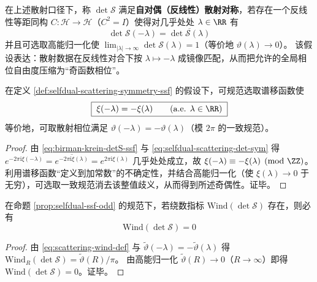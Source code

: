 \begin{definition}\label{def:selfdual-scattering-symmetry-ssf}
在上述散射口径下，称 \(\det\mathcal S\) 满足\textbf{自对偶（反线性）散射对称}，若存在一个反线性等距同构 \(C:\mathcal H\to\mathcal H\)（\(C^2=I\)）使得对几乎处处 \(\lambda\in\RR\) 有
\begin{equation}\label{eq:selfdual-scattering-det-sym}
\boxed{\;\det\mathcal S(-\lambda)=\overline{\det\mathcal S(\lambda)}\;}
\end{equation}
并且可选取高能归一化使 \(\lim_{|\lambda|\to\infty}\det\mathcal S(\lambda)=1\)（等价地 \(\vartheta(\lambda)\to 0\)）。
该假设表达：散射数据在反线性对合下按 \(\lambda\mapsto-\lambda\) 成镜像匹配，从而把允许的全局相位自由度压缩为“奇函数相位”。
\end{definition}

\begin{proposition}[谱移奇偶性强制]\label{prop:selfdual-ssf-odd}
在定义 \ref{def:selfdual-scattering-symmetry-ssf} 的假设下，可规范选取谱移函数使
\[
\boxed{\;\xi(-\lambda)=-\xi(\lambda)\qquad(\text{a.e. }\lambda\in\RR)\;}
\]
等价地，可取散射相位满足 \(\vartheta(-\lambda)=-\vartheta(\lambda)\)（模 \(2\pi\) 的一致规范）。
\end{proposition}

\begin{proof}
由 \eqref{eq:birman-krein-detS-ssf} 与 \eqref{eq:selfdual-scattering-det-sym} 得
\(
e^{-2\pi\mathrm{i}\xi(-\lambda)}=\overline{e^{-2\pi\mathrm{i}\xi(\lambda)}}=e^{2\pi\mathrm{i}\xi(\lambda)}
\)
几乎处处成立，故 \(\xi(-\lambda)\equiv-\xi(\lambda)\pmod{\ZZ}\)。
利用谱移函数“定义到加常数”的不确定性，并结合高能归一化（使 \(\xi(\lambda)\to 0\) 于无穷），可选取一致规范消去该整值歧义，从而得到所述奇偶性。证毕。
\end{proof}

\begin{proposition}\label{prop:selfdual-wind-vanish}
在命题 \ref{prop:selfdual-ssf-odd} 的规范下，若绕数指标 \(\mathrm{Wind}(\det\mathcal S)\) 存在，则必有
\[
\boxed{\;\mathrm{Wind}(\det\mathcal S)=0\;}
\]
\end{proposition}

\begin{proof}
由 \eqref{eq:scattering-wind-def} 与 \(\widetilde\vartheta(-\lambda)=-\widetilde\vartheta(\lambda)\) 得 \(\mathrm{Wind}_R(\det\mathcal S)=\widetilde\vartheta(R)/\pi\)。
由高能归一化 \(\widetilde\vartheta(R)\to 0\)（\(R\to\infty\)）即得 \(\mathrm{Wind}(\det\mathcal S)=0\)。证毕。
\end{proof}

